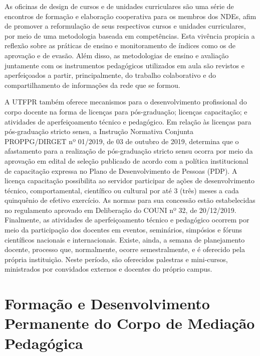 As oficinas de design de cursos e de unidades curriculares são uma série de encontros de formação e elaboração cooperativa para os membros dos NDEs, afim de promover a reformulação de seus respectivos cursos e unidades curriculares, por meio de uma metodologia baseada em competências. Esta vivência propicia a reflexão sobre as práticas de ensino e monitoramento de índices como os de aprovação e de evasão. Além disso, as metodologias de ensino e avaliação juntamente com os instrumentos pedagógicos utilizados em aula são revistos e aperfeiçoados a partir, principalmente, do trabalho colaborativo e do compartilhamento de informações da rede que se formou.

A UTFPR também oferece mecanismos para o desenvolvimento profissional do corpo docente na forma de licenças para pós-graduação; licenças capacitação; e atividades de aperfeiçoamento técnico e pedagógico. Em relação às licenças para pós-graduação stricto sensu, a Instrução Normativa Conjunta PROPPG/DIRGET nº 01/2019, de 03 de outubro de 2019, determina que o afastamento para a realização de pós-graduação stricto sensu ocorra por meio da aprovação em edital de seleção publicado de acordo com a política institucional de capacitação expressa no Plano de Desenvolvimento de Pessoas (PDP). A licença capacitação possibilita ao servidor participar de ações de desenvolvimento técnico, comportamental, científico ou cultural por até 3 (três) meses a cada quinquênio de efetivo exercício. As normas para sua concessão estão estabelecidas no regulamento aprovado em Deliberação do COUNI nº  32, de 20/12/2019. Finalmente, as atividades de aperfeiçoamento técnico e pedagógico ocorrem por meio da participação dos docentes em eventos, seminários, simpósios e fóruns científicos nacionais e internacionais. Existe, ainda, a semana de planejamento docente, processo que, normalmente, ocorre semestralmente, e é oferecido pela própria instituição. Neste período, são oferecidos palestras e mini-cursos, ministrados por convidados externos e docentes do próprio campus.


\section{Formação e Desenvolvimento Permanente do Corpo de Mediação Pedagógica}

